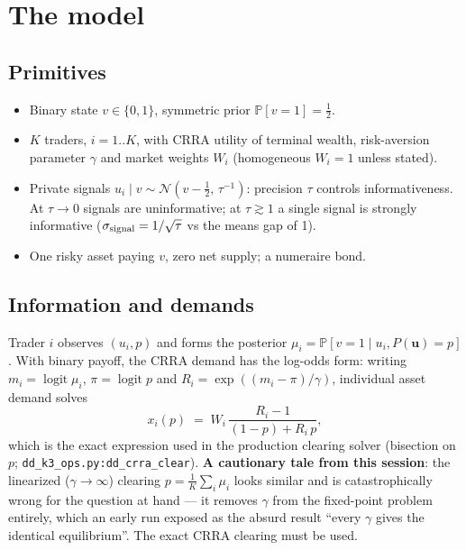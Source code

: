 \documentclass[11pt]{report}
\begin{document}
\chapter{The model}

\section{Primitives}
\begin{itemize}\itemsep2pt
  \item Binary state $v \in \{0, 1\}$, symmetric prior
        $\mathbb{P}[v{=}1] = \tfrac12$.
  \item $K$ traders, $i = 1..K$, with CRRA utility of terminal wealth,
        risk-aversion parameter $\gamma$ and market weights $W_i$
        (homogeneous $W_i = 1$ unless stated).
  \item Private signals $u_i \mid v \sim \mathcal{N}(v - \tfrac12,\,
        \tau^{-1})$: precision $\tau$ controls informativeness. At
        $\tau \to 0$ signals are uninformative; at $\tau \gtrsim 1$
        a single signal is strongly informative
        ($\sigma_{\rm signal} = 1/\sqrt{\tau}$ vs the means gap of 1).
  \item One risky asset paying $v$, zero net supply; a numeraire bond.
\end{itemize}

\section{Information and demands}
Trader $i$ observes $(u_i, p)$ and forms the posterior
$\mu_i = \mathbb{P}[v{=}1 \mid u_i, P(\mathbf{u}) = p]$. With binary
payoff, the CRRA demand has the log-odds form: writing
$m_i = \operatorname{logit}\mu_i$, $\pi = \operatorname{logit}p$ and
$R_i = \exp((m_i - \pi)/\gamma)$, individual asset demand solves
\[
  x_i(p) \;=\; W_i\,\frac{R_i - 1}{(1 - p) + R_i\,p},
\]
which is the exact expression used in the production clearing solver
(bisection on $p$; \texttt{dd\_k3\_ops.py:dd\_crra\_clear}).
\textbf{A cautionary tale from this session}: the linearized
($\gamma \to \infty$) clearing $p = \frac1K \sum_i \mu_i$ looks similar
and is catastrophically wrong for the question at hand --- it removes
$\gamma$ from the fixed-point problem entirely, which an early run
exposed as the absurd result ``every $\gamma$ gives the identical
equilibrium''. The exact CRRA clearing must be used.
\end{document}

